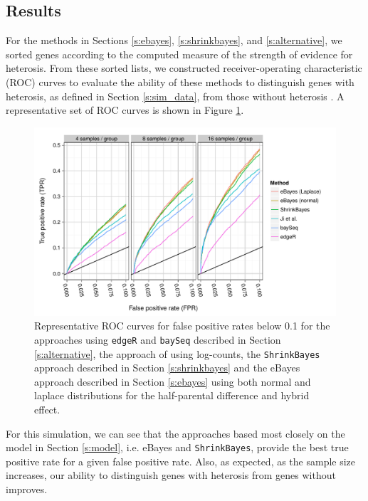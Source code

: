\documentclass[useAMS,usenatbib,referee]{biom}
\newcommand{\edgeR}{{\tt edgeR}}
\newcommand{\baySeq}{{\tt baySeq}}
\newcommand{\ShrinkBayes}{{\tt ShrinkBayes}}
\begin{document}
\subsection{Results}

For the methods in Sections \ref{s:ebayes}, \ref{s:shrinkbayes}, and \ref{s:alternative}, we sorted genes according to the computed measure of the strength of evidence for heterosis. From these sorted lists, we constructed receiver-operating characteristic (ROC) curves to evaluate the ability of these methods to distinguish genes with heterosis, as defined in Section \ref{s:sim_data}, 
from those without heterosis \citep{landau2013dispersion}. A representative set of ROC curves is shown in Figure \ref{f:roc}. 
\begin{figure}[htbp]
\centerline{\includegraphics[width=\textwidth]{exampleROC0_1}}
\caption{Representative ROC curves for false positive rates below 0.1 for the approaches using \edgeR{} and \baySeq{} described in Section \ref{s:alternative}, the approach of \cite{} using log-counts, the \ShrinkBayes{} approach described in Section \ref{s:shrinkbayes} and the eBayes approach described in Section \ref{s:ebayes} using both normal and laplace distributions for the half-parental difference and hybrid effect.}
\label{f:roc}
\end{figure}
For this simulation, we can see that the approaches based most closely on the model in Section \ref{s:model}, i.e. eBayes and \ShrinkBayes{}, provide the best true positive rate for a given false positive rate. Also, as expected, as the sample size increases, our ability to distinguish genes with heterosis from genes without improves. 
\end{document}
